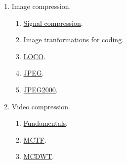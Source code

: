 \begin{enumerate}
\item Image compression.
  \begin{enumerate}
  \item \href{https://rawgit.com/vicente-gonzalez-ruiz/signal_redundancies/master/index.html}{Signal compression}.
  \item \href{https://cdn.rawgit.com/vicente-gonzalez-ruiz/transform_coding/master/index.html}{Image tranformations for coding}.
  \item \href{https://cdn.rawgit.com/vicente-gonzalez-ruiz/LOCO/master/index.html}{LOCO}.
  \item \href{https://cdn.rawgit.com/vicente-gonzalez-ruiz/JPEG/master/index.html}{JPEG}.
  \item \href{https://cdn.rawgit.com/vicente-gonzalez-ruiz/JPEG2000/master/index.html}{JPEG2000}.
  \end{enumerate}
\item Video compression.
  \begin{enumerate}
  \item \href{https://cdn.rawgit.com/vicente-gonzalez-ruiz/video_compression/master/index.html}{Fundamentals}.
  \item \href{https://github.com/vicente-gonzalez-ruiz/MCTF-video-coding}{MCTF}.
  \item \href{https://github.com/vicente-gonzalez-ruiz/MCDWT}{MCDWT}.
  \end{enumerate}
\end{enumerate}


